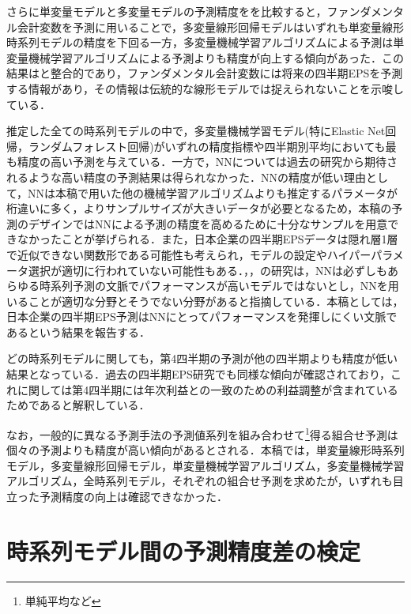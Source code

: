 \documentclass[a4paper，11pt]{jsarticle}
\begin{document}
さらに単変量モデルと多変量モデルの予測精度をを比較すると，ファンダメンタル会計変数を予測に用いることで，多変量線形回帰モデルはいずれも単変量線形時系列モデルの精度を下回る一方，多変量機械学習アルゴリズムによる予測は単変量機械学習アルゴリズムによる予測よりも精度が向上する傾向があった．この結果は\cite{zhang2004neural}と整合的であり，ファンダメンタル会計変数には将来の四半期EPSを予測する情報があり，その情報は伝統的な線形モデルでは捉えられないことを示唆している．

推定した全ての時系列モデルの中で，多変量機械学習モデル(特にElastic Net回帰，ランダムフォレスト回帰)がいずれの精度指標や四半期別平均においても最も精度の高い予測を与えている．一方で，NNについては過去の研究から期待されるような高い精度の予測結果は得られなかった．NNの精度が低い理由として，NNは本稿で用いた他の機械学習アルゴリズムよりも推定するパラメータが桁違いに多く，よりサンプルサイズが大きいデータが必要となるため，本稿の予測のデザインではNNによる予測の精度を高めるために十分なサンプルを用意できなかったことが挙げられる．また，日本企業の四半期EPSデータは隠れ層1層で近似できない関数形である可能性も考えられ，モデルの設定やハイパーパラメータ選択が適切に行われていない可能性もある．\cite{chatfield1993neural}，\cite{hill1994artificial}，\cite{callen1996neural}の研究は，NNは必ずしもあらゆる時系列予測の文脈でパフォーマンスが高いモデルではないとし，NNを用いることが適切な分野とそうでない分野があると指摘している．本稿としては，日本企業の四半期EPS予測はNNにとってパフォーマンスを発揮しにくい文脈であるという結果を報告する．

どの時系列モデルに関しても，第4四半期の予測が他の四半期よりも精度が低い結果となっている．過去の四半期EPS研究でも同様な傾向が確認されており，これに関して\cite{sakurai1990}は第4四半期には年次利益との一致のための利益調整が含まれているためであると解釈している．

なお，一般的に異なる予測手法の予測値系列を組み合わせて\footnote{単純平均など}得る組合せ予測\citep*{bates1969combination}は個々の予測よりも精度が高い傾向があるとされる．本稿では，単変量線形時系列モデル，多変量線形回帰モデル，単変量機械学習アルゴリズム，多変量機械学習アルゴリズム，全時系列モデル，それぞれの組合せ予測を求めたが，いずれも目立った予測精度の向上は確認できなかった．

\section{時系列モデル間の予測精度差の検定}
\end{document}
